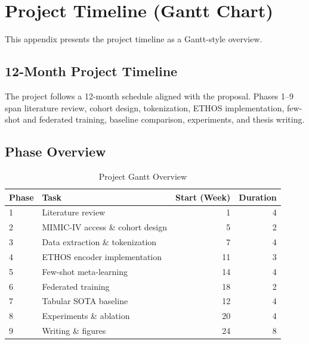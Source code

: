 \chapter{Project Timeline (Gantt Chart)}
\label{app:gantt}

This appendix presents the project timeline as a Gantt-style overview.

\section{12-Month Project Timeline}

The project follows a 12-month schedule aligned with the proposal. Phases 1--9 span literature review, cohort design, tokenization, ETHOS implementation, few-shot and federated training, baseline comparison, experiments, and thesis writing.

\section{Phase Overview}

\begin{table}[h]
\centering
\caption{Project Gantt Overview}
\begin{tabular}{llrr}
\toprule
Phase & Task & Start (Week) & Duration \\
\midrule
1 & Literature review & 1 & 4 \\
2 & MIMIC-IV access \& cohort design & 5 & 2 \\
3 & Data extraction \& tokenization & 7 & 4 \\
4 & ETHOS encoder implementation & 11 & 3 \\
5 & Few-shot meta-learning & 14 & 4 \\
6 & Federated training & 18 & 2 \\
7 & Tabular SOTA baseline & 12 & 4 \\
8 & Experiments \& ablation & 20 & 4 \\
9 & Writing \& figures & 24 & 8 \\
\bottomrule
\end{tabular}
\label{tab:gantt}
\end{table}

